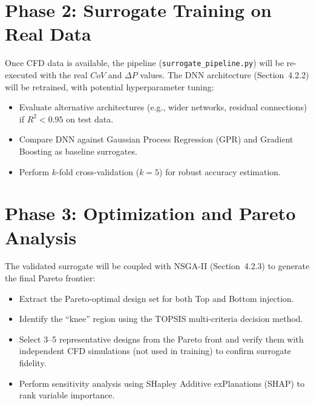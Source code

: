 \documentclass[12pt, a4paper]{report}
\begin{document}
\section{Phase 2: Surrogate Training on Real Data}

Once CFD data is available, the pipeline (\texttt{surrogate\_pipeline.py}) will be re-executed with the real $CoV$ and $\Delta P$ values. The DNN architecture (Section~4.2.2) will be retrained, with potential hyperparameter tuning:
\begin{itemize}
    \item Evaluate alternative architectures (e.g., wider networks, residual connections) if $R^2 < 0.95$ on test data.
    \item Compare DNN against Gaussian Process Regression (GPR) and Gradient Boosting as baseline surrogates.
    \item Perform $k$-fold cross-validation ($k = 5$) for robust accuracy estimation.
\end{itemize}

\section{Phase 3: Optimization and Pareto Analysis}

The validated surrogate will be coupled with NSGA-II (Section~4.2.3) to generate the final Pareto frontier:
\begin{itemize}
    \item Extract the Pareto-optimal design set for both Top and Bottom injection.
    \item Identify the ``knee'' region using the TOPSIS multi-criteria decision method.
    \item Select 3--5 representative designs from the Pareto front and verify them with independent CFD simulations (not used in training) to confirm surrogate fidelity.
    \item Perform sensitivity analysis using SHapley Additive exPlanations (SHAP) to rank variable importance.
\end{itemize}
\end{document}
